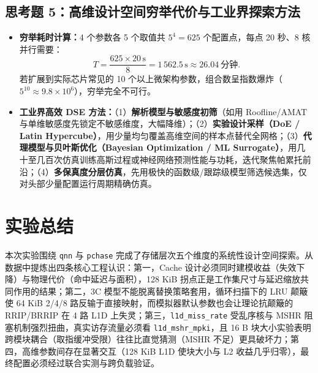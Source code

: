 \documentclass[12pt,a4paper,fontset=mac]{ctexart}
\begin{document}
\subsection{思考题 5：高维设计空间穷举代价与工业界探索方法}
\begin{itemize}
  \item \textbf{穷举耗时计算：}4 个参数各 5 个取值共 $5^4 = 625$ 个配置点，每点 20 秒、8 核并行需要：
  \[
  T = \frac{625 \times 20\,\text{s}}{8} = 1\,562.5\,\text{s} \approx \mathbf{26.04\ \text{分钟}}.
  \]
  若扩展到实际芯片常见的 10 个以上微架构参数，组合数呈指数爆炸（$5^{10} \approx 9.8\times10^6$），穷举完全不可行。
  \item \textbf{工业界高效 DSE 方法：}（1）\textbf{解析模型与敏感度初筛}（如用 Roofline/AMAT 与单维敏感度先锁定不敏感维度，大幅降维）；（2）\textbf{实验设计采样（DoE / Latin Hypercube）}，用少量均匀覆盖高维空间的样本点替代全网格；（3）\textbf{代理模型与贝叶斯优化（Bayesian Optimization / ML Surrogate）}，用几十至几百次仿真训练高斯过程或神经网络预测性能与功耗，迭代聚焦帕累托前沿；（4）\textbf{多保真度分层仿真}，先用极快的函数级/跟踪级模型筛选候选集，仅对头部少量配置运行周期精确仿真。
\end{itemize}

\section{实验总结}
本次实验围绕 \texttt{qnn} 与 \texttt{pchase} 完成了存储层次五个维度的系统性设计空间探索。从数据中提炼出四条核心工程认识：第一，Cache 设计必须同时建模收益（失效下降）与物理代价（命中延迟与面积），128 KiB 拐点正是工作集尺寸与延迟缩放共同作用的结果；第二，3C 模型不能脱离替换策略套用，循环扫描下的 LRU 颠簸使 64 KiB 2/4/8 路反输于直接映射，而模拟器默认参数也会让理论抗颠簸的 RRIP/BRRIP 在 4 路 L1D 上失灵；第三，\texttt{l1d\_miss\_rate} 受乱序核与 MSHR 阻塞机制强烈扭曲，真实访存流量必须看 \texttt{l1d\_mshr\_mpki}，且 16 B 块大小实验表明跨模块耦合（取指缓冲受限）往往比直觉猜测（MSHR 不足）更具破坏力；第四，高维参数间存在显著交互（128 KiB L1D 使块大小与 L2 收益几乎归零），最终配置必须经过联合实测与跨负载验证。
\end{document}
